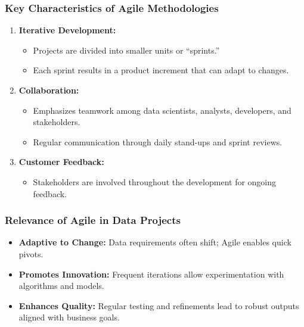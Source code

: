 \documentclass[aspectratio=169]{beamer}
\begin{document}
\begin{frame}[fragile]
    \frametitle{Key Characteristics of Agile Methodologies}
    \begin{enumerate}
        \item \textbf{Iterative Development:}
        \begin{itemize}
            \item Projects are divided into smaller units or “sprints.”
            \item Each sprint results in a product increment that can adapt to changes.
        \end{itemize}
        
        \item \textbf{Collaboration:}
        \begin{itemize}
            \item Emphasizes teamwork among data scientists, analysts, developers, and stakeholders.
            \item Regular communication through daily stand-ups and sprint reviews.
        \end{itemize}
        
        \item \textbf{Customer Feedback:}
        \begin{itemize}
            \item Stakeholders are involved throughout the development for ongoing feedback.
        \end{itemize}
    \end{enumerate}
\end{frame}

\begin{frame}[fragile]
    \frametitle{Relevance of Agile in Data Projects}
    \begin{itemize}
        \item \textbf{Adaptive to Change:}
        Data requirements often shift; Agile enables quick pivots.
        
        \item \textbf{Promotes Innovation:}
        Frequent iterations allow experimentation with algorithms and models.
        
        \item \textbf{Enhances Quality:}
        Regular testing and refinements lead to robust outputs aligned with business goals.
    \end{itemize}
\end{frame}
\end{document}
